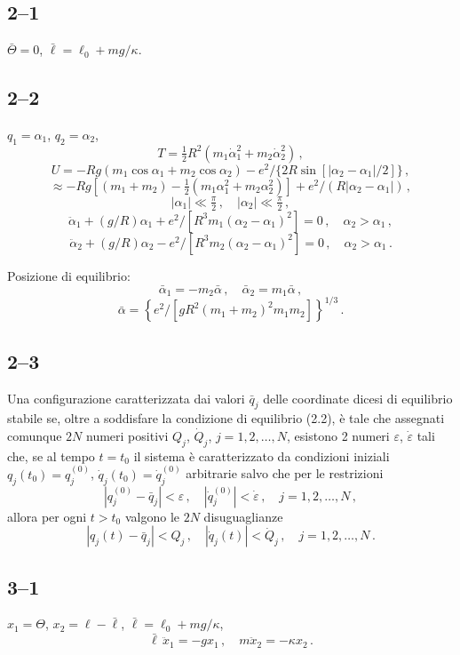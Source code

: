 \documentclass[11pt, a4paper]{book}
\numberwithin{equation}{section}
\begin{document}
\subsection*{2--1}
$\bar{\Theta} = 0$, $\bar{\ell} = \ell_0 + mg/\kappa$.

\subsection*{2--2}
$q_1 = \alpha_1$, $q_2 = \alpha_2$,
\[
    T = \tfrac{1}{2}R^2(m_1\dot{\alpha}_1^2 + m_2\dot{\alpha}_2^2) \,,
\]
\[
    U = -Rg(m_1\cos\alpha_1 + m_2\cos\alpha_2)
    - e^2 / \{2R\sin[|\alpha_2-\alpha_1|/2]\} \,,
\]
\[
    \approx -Rg\left[(m_1+m_2) - \tfrac{1}{2}(m_1\alpha_1^2+m_2\alpha_2^2)\right]
    + e^2/(R|\alpha_2-\alpha_1|) \,,
\]
\[
    |\alpha_1| \ll \tfrac{\pi}{2}\,, \quad |\alpha_2| \ll \tfrac{\pi}{2} \,,
\]
\[
    \ddot{\alpha}_1 + (g/R)\alpha_1 + e^2/[R^3 m_1(\alpha_2-\alpha_1)^2] = 0\,,
    \quad \alpha_2 > \alpha_1 \,,
\]
\[
    \ddot{\alpha}_2 + (g/R)\alpha_2 - e^2/[R^3 m_2(\alpha_2-\alpha_1)^2] = 0\,,
    \quad \alpha_2 > \alpha_1 \,.
\]

Posizione di equilibrio:
\[
    \bar{\alpha}_1 = -m_2\bar{\alpha}\,, \quad \bar{\alpha}_2 = m_1\bar{\alpha}\,,
\]
\[
    \bar{\alpha} = \left\{ e^2 / \left[ gR^2(m_1+m_2)^2 m_1 m_2 \right] \right\}^{1/3} \,.
\]

\subsection*{2--3}
Una configurazione caratterizzata dai valori $\bar{q}_j$ delle coordinate dicesi
di equilibrio stabile se, oltre a soddisfare la condizione di equilibrio (2.2),
è tale che assegnati comunque $2N$ numeri positivi $Q_j$, $\dot{Q}_j$,
$j=1,2,\ldots,N$, esistono 2 numeri $\varepsilon$, $\dot{\varepsilon}$ tali che, se al tempo
$t=t_0$ il sistema è caratterizzato da condizioni iniziali $q_j(t_0)=q_j^{(0)}$,
$\dot{q}_j(t_0)=\dot{q}_j^{(0)}$ arbitrarie salvo che per le restrizioni
\[
    |q_j^{(0)} - \bar{q}_j| < \varepsilon\,, \quad |\dot{q}_j^{(0)}| < \dot{\varepsilon}\,,
    \quad j=1,2,\ldots,N\,,
\]
allora per ogni $t > t_0$ valgono le $2N$ disuguaglianze
\[
    |q_j(t) - \bar{q}_j| < Q_j\,, \quad |\dot{q}_j(t)| < \dot{Q}_j\,,
    \quad j=1,2,\ldots,N \,.
\]

\subsection*{3--1}
$x_1 = \Theta$, $x_2 = \ell - \bar{\ell}$, $\bar{\ell} = \ell_0 + mg/\kappa$,
\[
    \bar{\ell}\,\ddot{x}_1 = -g x_1\,, \quad m\ddot{x}_2 = -\kappa x_2 \,.
\]
\end{document}
